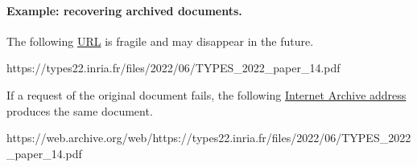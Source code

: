 \paragraph*{Example: recovering archived documents.}\mbox{}

The following \href{https://types22.inria.fr/files/2022/06/TYPES_2022_paper_14.pdf}{URL} is fragile and may disappear in the future.
\begin{center}
\begin{minipage}{\textwidth}
\begin{browserlisting}[nolol]
https://types22.inria.fr/files/2022/06/TYPES_2022_paper_14.pdf
\end{browserlisting}
\end{minipage}
\end{center}

If a request of the original document fails, the following \href{https://web.archive.org/web/https://types22.inria.fr/files/2022/06/TYPES_2022_paper_14.pdf}{Internet Archive address} produces the same document.
\begin{center}
\begin{minipage}{\textwidth}
\begin{browserlisting}[nolol]
https://web.archive.org/web/https://types22.inria.fr/files/2022/06/TYPES_2022_paper_14.pdf
\end{browserlisting}
\end{minipage}
\end{center}